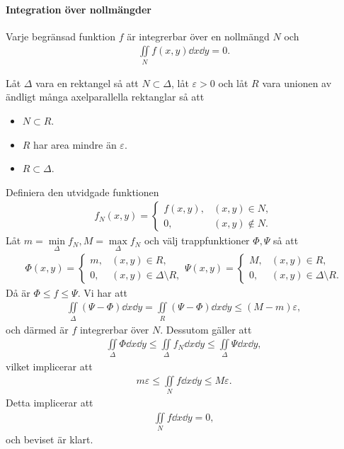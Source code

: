 \proof

\paragraph{Integration över nollmängder}
Varje begränsad funktion $f$ är integrerbar över en nollmängd $N$ och
\begin{align*}
	\iint\limits_{N}f(x, y)\dd{x}\dd{y} = 0.
\end{align*}

\proof
Låt $\Delta$ vara en rektangel så att $N\subset\Delta$, låt $\varepsilon > 0$ och låt $R$ vara unionen av ändligt många axelparallella rektanglar så att
\begin{itemize}
	\item $N\subset R$.
	\item $R$ har area mindre än $\varepsilon$.
	\item $R\subset\Delta$.
\end{itemize}
Definiera den utvidgade funktionen
\begin{align*}
	f_N(x, y) =
	\begin{cases}
		f(x, y), &(x, y)\in N, \\
		0,       &(x, y)\not\in N.
	\end{cases}
\end{align*}
Låt $m = \min\limits_{\Delta}f_N, M = \max\limits_{\Delta}f_N$ och välj trappfunktioner $\Phi, \Psi$ så att
\begin{align*}
	\Phi(x, y) =
	\begin{cases}
		m, &(x, y)\in R, \\
		0, &(x, y)\in \Delta\setminus R,
	\end{cases}
	\Psi(x, y) =
	\begin{cases}
		M, &(x, y)\in R, \\
		0, &(x, y)\in \Delta\setminus R.
	\end{cases}
\end{align*}
Då är $\Phi\leq f\leq\Psi$. Vi har att
\begin{align*}
	\iint\limits_{\Delta}(\Psi - \Phi)\dd{x}\dd{y} = \iint\limits_{R}(\Psi - \Phi)\dd{x}\dd{y}\leq(M - m)\varepsilon,
\end{align*}
och därmed är $f$ integrerbar över $N$. Dessutom gäller att
\begin{align*}
	\iint\limits_{\Delta}\Phi\dd{x}\dd{y}\leq\iint\limits_{\Delta}f_{N}\dd{x}\dd{y}\leq\iint\limits_{\Delta}\Psi\dd{x}\dd{y},
\end{align*}
vilket implicerar att
\begin{align*}
	m\varepsilon\leq\iint\limits_{N}f\dd{x}\dd{y}\leq M\varepsilon.
\end{align*}
Detta implicerar att
\begin{align*}
	\iint\limits_{N}f\dd{x}\dd{y} = 0,
\end{align*}
och beviset är klart.

